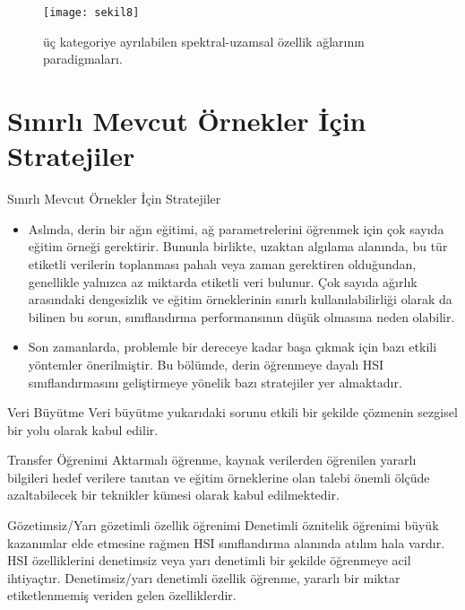 \documentclass{beamer}
\begin{document}
\begin{frame}
\begin{figure}[]
  \centering
  \texttt{[image: sekil8]}
  \label{fig:sekil4}
  \caption{üç kategoriye ayrılabilen spektral-uzamsal özellik ağlarının paradigmaları.}
\end{figure}
\end{frame}

\section{Sınırlı Mevcut Örnekler İçin Stratejiler}
\begin{frame}{Sınırlı Mevcut Örnekler İçin Stratejiler}
\begin{itemize}
  \item Aslında, derin bir ağın eğitimi, ağ parametrelerini öğrenmek için çok sayıda eğitim örneği gerektirir. Bununla birlikte, uzaktan algılama alanında, bu tür etiketli verilerin toplanması pahalı veya zaman gerektiren olduğundan, genellikle yalnızca az miktarda etiketli veri bulunur. Çok sayıda ağırlık arasındaki dengesizlik ve eğitim örneklerinin sınırlı kullanılabilirliği olarak da bilinen bu sorun, sınıflandırma performansının düşük olmasına neden olabilir. 

  \item Son zamanlarda, problemle bir dereceye kadar başa çıkmak için bazı etkili yöntemler önerilmiştir. Bu bölümde, derin öğrenmeye dayalı HSI sınıflandırmasını geliştirmeye yönelik bazı stratejiler yer almaktadır.
\end{itemize}
\end{frame}

\begin{frame}{Veri Büyütme}
Veri büyütme yukarıdaki sorunu etkili bir şekilde çözmenin sezgisel bir yolu olarak kabul edilir.
\end{frame}

\begin{frame}{Transfer Öğrenimi}
Aktarmalı öğrenme, kaynak verilerden öğrenilen yararlı bilgileri hedef verilere tanıtan ve eğitim örneklerine olan talebi önemli ölçüde azaltabilecek bir teknikler kümesi olarak kabul edilmektedir.
\end{frame}

\begin{frame}{Gözetimsiz/Yarı gözetimli özellik öğrenimi}
Denetimli öznitelik öğrenimi büyük kazanımlar elde etmesine rağmen HSI sınıflandırma alanında atılım hala vardır. HSI özelliklerini denetimsiz veya yarı denetimli bir şekilde öğrenmeye acil ihtiyaçtır. Denetimsiz/yarı denetimli özellik öğrenme, yararlı bir miktar etiketlenmemiş veriden gelen özelliklerdir.
\end{frame}
\end{document}
